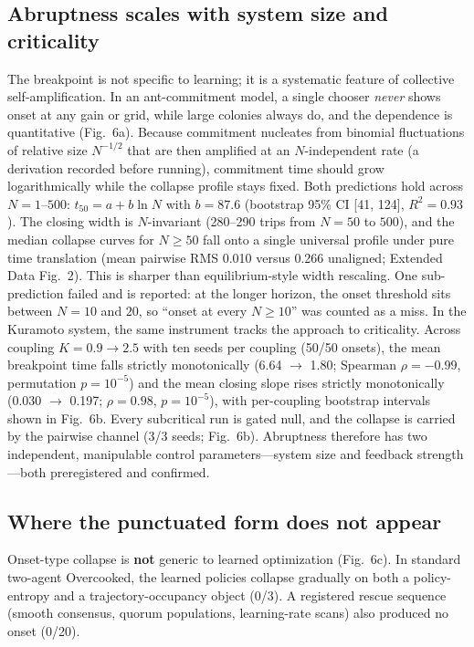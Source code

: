 \documentclass[11pt]{article}
\begin{document}
\subsection*{Abruptness scales with system size and criticality}

The breakpoint is not specific to learning; it is a systematic feature
of collective self-amplification. In an ant-commitment model, a single
chooser \emph{never} shows onset at any gain or grid, while large
colonies always do, and the dependence is quantitative (Fig.~6a).
Because commitment nucleates from binomial fluctuations of relative
size $N^{-1/2}$ that are then amplified at an $N$-independent rate (a
derivation recorded before running), commitment time should grow
logarithmically while the collapse profile stays fixed. Both
predictions hold across $N=1$--$500$: $t_{50}=a+b\ln N$ with $b=87.6$
(bootstrap 95\% CI [41, 124], $R^{2}=0.93$). The closing width is
$N$-invariant (280--290 trips from $N{=}50$ to $500$), and the median
collapse curves for $N\geq 50$ fall onto a single universal profile
under pure time translation (mean pairwise RMS 0.010 versus 0.266
unaligned; Extended Data Fig.~2). This is sharper than
equilibrium-style width rescaling\citep{stanley1971introduction}. One
sub-prediction failed and is reported: at the longer horizon, the
onset threshold sits between $N=10$ and $20$, so ``onset at every
$N\geq10$'' was counted as a miss. In the Kuramoto system, the same
instrument tracks the approach to criticality. Across coupling
$K=0.9\to2.5$ with ten seeds per coupling (50/50 onsets), the mean
breakpoint time falls strictly monotonically (6.64 $\to$ 1.80;
Spearman $\rho=-0.99$, permutation $p=10^{-5}$) and the mean closing
slope rises strictly monotonically (0.030 $\to$ 0.197; $\rho=0.98$,
$p=10^{-5}$), with per-coupling bootstrap intervals shown in Fig.~6b.
Every subcritical run is gated null, and the
collapse is carried by the pairwise channel (3/3 seeds;
Fig.~6b)\citep{acebron2005kuramoto}. Abruptness therefore has two
independent, manipulable control parameters---system size and feedback
strength---both preregistered and confirmed.

\subsection*{Where the punctuated form does not appear}

Onset-type collapse is \textbf{not} generic to learned
optimization (Fig.~6c). In standard two-agent Overcooked, the learned
policies collapse gradually on both a policy-entropy and a
trajectory-occupancy object (0/3). A registered rescue sequence
(smooth consensus, quorum populations, learning-rate scans) also
produced no onset (0/20).
\end{document}
